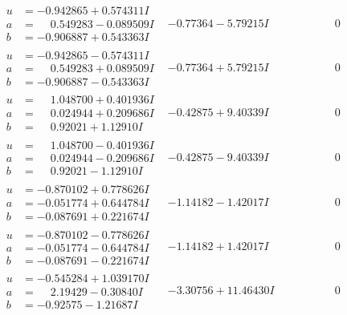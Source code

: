 \documentclass[1p]{elsarticle_modified}
\theoremstyle{definition}
\begin{document}
$$\begin{array}{c|c|c}
\begin{aligned}
u &= -0.942865 + 0.574311 I \\
a &= \phantom{-}0.549283 - 0.089509 I \\
b &= -0.906887 + 0.543363 I\end{aligned}
 & -0.77364 - 5.79215 I & \phantom{-0.000000 } 0 \\ \hline\begin{aligned}
u &= -0.942865 - 0.574311 I \\
a &= \phantom{-}0.549283 + 0.089509 I \\
b &= -0.906887 - 0.543363 I\end{aligned}
 & -0.77364 + 5.79215 I & \phantom{-0.000000 } 0 \\ \hline\begin{aligned}
u &= \phantom{-}1.048700 + 0.401936 I \\
a &= \phantom{-}0.024944 + 0.209686 I \\
b &= \phantom{-}0.92021 + 1.12910 I\end{aligned}
 & -0.42875 + 9.40339 I & \phantom{-0.000000 } 0 \\ \hline\begin{aligned}
u &= \phantom{-}1.048700 - 0.401936 I \\
a &= \phantom{-}0.024944 - 0.209686 I \\
b &= \phantom{-}0.92021 - 1.12910 I\end{aligned}
 & -0.42875 - 9.40339 I & \phantom{-0.000000 } 0 \\ \hline\begin{aligned}
u &= -0.870102 + 0.778626 I \\
a &= -0.051774 + 0.644784 I \\
b &= -0.087691 + 0.221674 I\end{aligned}
 & -1.14182 - 1.42017 I & \phantom{-0.000000 } 0 \\ \hline\begin{aligned}
u &= -0.870102 - 0.778626 I \\
a &= -0.051774 - 0.644784 I \\
b &= -0.087691 - 0.221674 I\end{aligned}
 & -1.14182 + 1.42017 I & \phantom{-0.000000 } 0 \\ \hline\begin{aligned}
u &= -0.545284 + 1.039170 I \\
a &= \phantom{-}2.19429 - 0.30840 I \\
b &= -0.92575 - 1.21687 I\end{aligned}
 & -3.30756 + 11.46430 I & \phantom{-0.000000 } 0 \\ \hline\begin{aligned}

\end{aligned}
\end{array}$$
\end{document}
